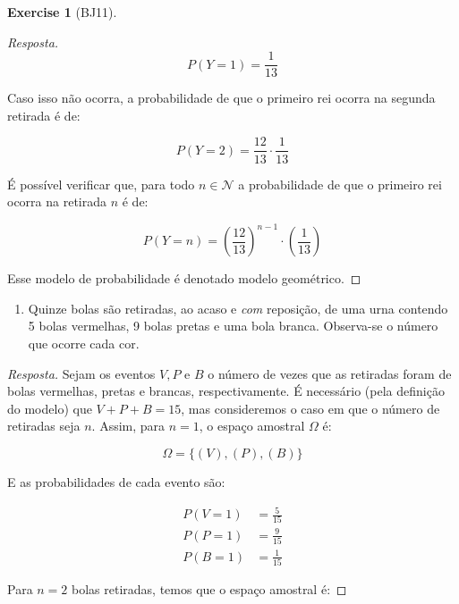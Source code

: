 \documentclass[
]{article}
\providecommand{\tightlist}{%
  \setlength{\itemsep}{0pt}\setlength{\parskip}{0pt}}
\theoremstyle{definition}
\theoremstyle{definition}
\theoremstyle{definition}
\newtheorem{exercise}{Exercise}[section]
\theoremstyle{definition}
\theoremstyle{remark}
\begin{document}
\begin{exercise}[BJ11]
\begin{proof}[Resposta]
\begin{equation*}
P(Y = 1) = \frac{1}{13}
\end{equation*}

Caso isso não ocorra, a probabilidade de que o primeiro rei ocorra na segunda retirada é de:

\begin{equation*}
P(Y = 2) = \frac{12}{13} \cdot \frac{1}{13}
\end{equation*}

É possível verificar que, para todo \(n \in \mathcal{N}\) a probabilidade de que o primeiro rei ocorra na retirada \(n\) é de:

\begin{equation*}
P(Y = n) = \left(\frac{12}{13}\right)^{n-1} \cdot \left(\frac{1}{13}\right)
\end{equation*}

Esse modelo de probabilidade é denotado modelo geométrico.
\end{proof}

\begin{enumerate}
\def\labelenumi{\alph{enumi})}
\setcounter{enumi}{2}
\tightlist
\item
  Quinze bolas são retiradas, ao acaso e \emph{com} reposição, de uma urna contendo 5 bolas vermelhas, 9 bolas pretas e uma bola branca. Observa-se o número que ocorre cada cor.
\end{enumerate}

\begin{proof}[Resposta]
Sejam os eventos \(V, P \text{ e } B\) o número de vezes que as retiradas foram de bolas vermelhas, pretas e brancas, respectivamente. É necessário (pela definição do modelo) que \(V + P + B = 15\), mas consideremos o caso em que o número de retiradas seja \(n\). Assim, para \(n = 1\), o espaço amostral \(\Omega\) é:

\begin{equation*}
\Omega = \{(V),(P),(B)\}
\end{equation*}

E as probabilidades de cada evento são:

\begin{align*}
P(V = 1) &= \frac{5}{15} \\
P(P = 1) &= \frac{9}{15} \\
P(B = 1) &= \frac{1}{15}
\end{align*}

Para \(n=2\) bolas retiradas, temos que o espaço amostral é:


\end{proof}
\end{exercise}
\end{document}
